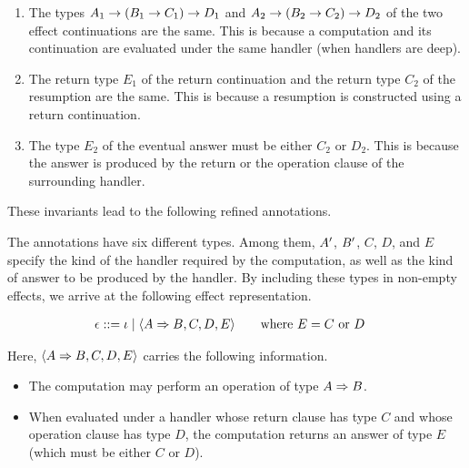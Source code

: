 \begin{enumerate}
\item The types $A_1 \rightarrow (B_1 \rightarrow C_1) \rightarrow D_1$ and
  $A_2 \rightarrow (B_2 \rightarrow C_2) \rightarrow D_2$ of the two effect 
  continuations are the same.
  This is because a computation and its continuation are evaluated under
  the same handler (when handlers are deep).

\item The return type $E_1$ of the return continuation and the return type
  $C_2$ of the resumption are the same.
  This is because a resumption is constructed using a return continuation.

\item The type $E_2$ of the eventual answer must be either $C_2$ or $D_2$.
  This is because the answer is produced by the return or the operation 
  clause of the surrounding handler.
\end{enumerate}

\noindent These invariants lead to the following refined annotations.


\noindent The annotations have six different types.
Among them, $A^\prime$, $B^\prime$, $C$, $D$, and $E$ specify the kind of the
handler required by the computation, as well as the kind of answer to be  
produced by the handler.
By including these types in non-empty effects, we arrive at the following
effect representation.

\begin{align*}
\epsilon &::= \iota \mid \langle A \Rightarrow B, C, D, E \rangle
\qquad \text{where } E = C \text{ or } D
\end{align*}

\noindent Here, $\langle A \Rightarrow B, C, D, E \rangle$ carries the following information.

\begin{itemize}
\item The computation may perform an operation of type $A \Rightarrow B$.
\item When evaluated under a handler whose return clause has type $C$ and
  whose operation clause has type $D$, the computation returns an answer
  of type $E$ (which must be either $C$ or $D$).
\end{itemize}

